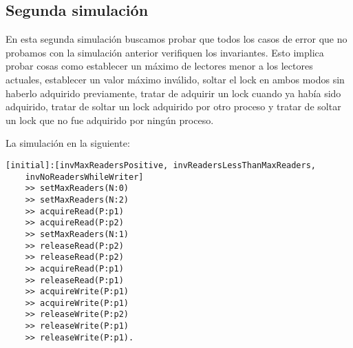 \documentclass[a4paper, 12pt]{article}
\begin{document}
\subsection{Segunda simulación}
En esta segunda simulación buscamos probar que todos los casos de error que no probamos con la simulación anterior verifiquen los invariantes. Esto implica probar cosas como establecer un máximo de lectores menor a los lectores actuales, establecer un valor máximo inválido, soltar el lock en ambos modos sin haberlo adquirido previamente, tratar de adquirir un lock cuando ya había sido adquirido, tratar de soltar un lock adquirido por otro proceso y tratar de soltar un lock que no fue adquirido por ningún proceso.

La simulación en la siguiente:
\begin{verbatim}
[initial]:[invMaxReadersPositive, invReadersLessThanMaxReaders, 
    invNoReadersWhileWriter] 
    >> setMaxReaders(N:0)
    >> setMaxReaders(N:2)
    >> acquireRead(P:p1)
    >> acquireRead(P:p2)
    >> setMaxReaders(N:1)
    >> releaseRead(P:p2)
    >> releaseRead(P:p2)
    >> acquireRead(P:p1)
    >> releaseRead(P:p1)
    >> acquireWrite(P:p1)
    >> acquireWrite(P:p1)
    >> releaseWrite(P:p2)
    >> releaseWrite(P:p1)
    >> releaseWrite(P:p1).
\end{verbatim}
\end{document}
